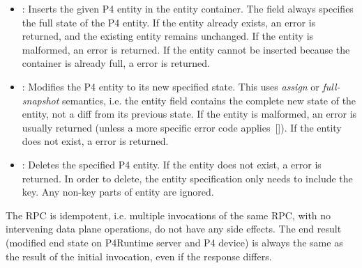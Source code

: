 \documentclass[11pt]{article}
\begin{document}
{\begin{itemize}
\item{}
: Inserts the given P4 entity in the entity container.
The  field always specifies the full state of the P4 entity.
If the entity already exists, an  error is returned, and
the existing entity remains unchanged.
If the entity is malformed, an  error is returned.
If the entity cannot be inserted because the container is already full,
a  error is returned.%

\item{}
: Modifies the P4 entity to its new specified state. This uses
\emph{assign} or \emph{full-snapshot} semantics, i.e. the entity field contains the
complete new state of the entity, not a diff from its previous state. If the
entity is malformed, an  error is usually returned (unless a
more specific error code applies~[]). If the entity does not
exist, a  error is returned.%

\item{}
: Deletes the specified P4 entity. If the entity does not exist, a
 error is returned. In order to delete, the entity specification
only needs to include the key. Any non-key parts of entity are ignored.%
\end{itemize}%

\noindent{}The  RPC is idempotent, i.e. multiple invocations of the same
RPC, with no intervening data plane operations, do not have any side
effects. The end result (modified end state on P4Runtime server and P4
device) is always the same as the result of the initial invocation,
even if the response differs.%

}
\end{document}
